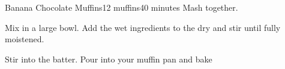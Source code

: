 \documentclass[../Cookbook.tex]{subfiles}
\begin{document}
\begin{recipe}[BananaChocolateMuffins]{Banana Chocolate Muffins}{12 muffins}{40 minutes}
	Mash together.

	Mix in a large bowl.
	Add the wet ingredients to the dry and stir until fully moistened.

	Stir into the batter.
	Pour into your muffin pan and bake 
\end{recipe}
\end{document}
